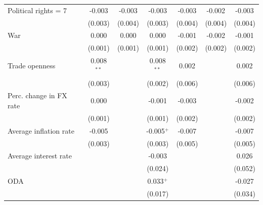\begin{table}[htbp]
\begin{tabular}{lcccccc}
      Political rights = 7       & -0.003            & -0.003            & -0.003            & -0.003            & -0.002            & -0.003\\   
                                 & (0.003)           & (0.004)           & (0.003)           & (0.004)           & (0.004)           & (0.004)\\   
      War                        & 0.000             & 0.000             & 0.000             & -0.001            & -0.002            & -0.001\\   
                                 & (0.001)           & (0.001)           & (0.001)           & (0.002)           & (0.002)           & (0.002)\\   
      Trade openness             & 0.008$^{**}$      &                   & 0.008$^{**}$      & 0.002             &                   & 0.002\\   
                                 & (0.003)           &                   & (0.002)           & (0.006)           &                   & (0.006)\\   
      Perc. change in FX rate    & 0.000             &                   & -0.001            & -0.003            &                   & -0.002\\   
                                 & (0.001)           &                   & (0.001)           & (0.002)           &                   & (0.002)\\   
      Average inflation rate     & -0.005            &                   & -0.005$^{+}$      & -0.007            &                   & -0.007\\   
                                 & (0.003)           &                   & (0.003)           & (0.005)           &                   & (0.005)\\   
      Average interest rate      &                   &                   & -0.003            &                   &                   & 0.026\\   
                                 &                   &                   & (0.024)           &                   &                   & (0.052)\\   
      ODA                        &                   &                   & 0.033$^{+}$       &                   &                   & -0.027\\   
                                 &                   &                   & (0.017)           &                   &                   & (0.034)\\   

\end{tabular}
\end{table}
